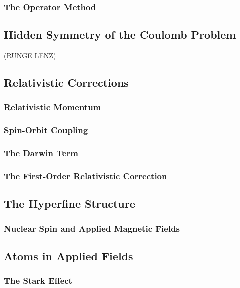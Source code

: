 \documentclass[12pt]{extarticle}
\theoremstyle{definition}
\begin{document}
\subsubsection{The Operator Method}

\subsection{Hidden Symmetry of the Coulomb Problem}

(RUNGE LENZ)

\subsection{Relativistic Corrections}

\subsubsection{Relativistic Momentum}

\subsubsection{Spin-Orbit Coupling}

\subsubsection{The Darwin Term}

\subsubsection{The First-Order Relativistic Correction}

\subsection{The Hyperfine Structure}

\subsubsection{Nuclear Spin and Applied Magnetic Fields}

\subsection{Atoms in Applied Fields}

\subsubsection{The Stark Effect}
\end{document}
